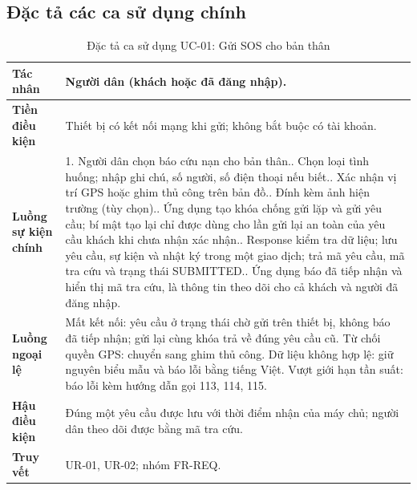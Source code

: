 \documentclass[12pt,a4paper,oneside]{report}
\begin{document}
\subsection{Đặc tả các ca sử dụng chính}
\begin{table}[H]
  \centering
  \caption{Đặc tả ca sử dụng UC-01: Gửi SOS cho bản thân}\label{tab:uc01-spec}
  \small
  \begin{tabularx}{\textwidth}{|L{3.0cm}|Y|}
    \hline
    \textbf{Tác nhân} & Người dân (khách hoặc đã đăng nhập). \\
    \hline
    \textbf{Tiền điều kiện} & Thiết bị có kết nối mạng khi gửi; không bắt buộc có tài khoản. \\
    \hline
    \textbf{Luồng sự kiện chính} & 1. Người dân chọn báo cứu nạn cho bản thân.. Chọn loại tình huống; nhập ghi chú, số người, số điện thoại nếu biết.. Xác nhận vị trí GPS hoặc ghim thủ công trên bản đồ.. Đính kèm ảnh hiện trường (tùy chọn).. Ứng dụng tạo khóa chống gửi lặp và gửi yêu cầu; bí mật tạo lại chỉ được dùng cho lần gửi lại an toàn của yêu cầu khách khi chưa nhận xác nhận.. Response kiểm tra dữ liệu; lưu yêu cầu, sự kiện và nhật ký trong một giao dịch; trả mã yêu cầu, mã tra cứu và trạng thái SUBMITTED.. Ứng dụng báo đã tiếp nhận và hiển thị mã tra cứu, là thông tin theo dõi cho cả khách và người đã đăng nhập. \\
    \hline
    \textbf{Luồng ngoại lệ} & Mất kết nối: yêu cầu ở trạng thái chờ gửi trên thiết bị, không báo đã tiếp nhận; gửi lại cùng khóa trả về đúng yêu cầu cũ. Từ chối quyền GPS: chuyển sang ghim thủ công. Dữ liệu không hợp lệ: giữ nguyên biểu mẫu và báo lỗi bằng tiếng Việt. Vượt giới hạn tần suất: báo lỗi kèm hướng dẫn gọi 113, 114, 115. \\
    \hline
    \textbf{Hậu điều kiện} & Đúng một yêu cầu được lưu với thời điểm nhận của máy chủ; người dân theo dõi được bằng mã tra cứu. \\
    \hline
    \textbf{Truy vết} & UR-01, UR-02; nhóm FR-REQ. \\
    \hline
  \end{tabularx}
\end{table}
\end{document}
